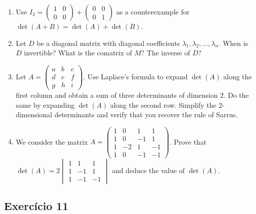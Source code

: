 \begin{enumerate}
\item Use $I_2 = \begin{pmatrix} 1 & 0 \\ 0 & 0 \end{pmatrix}
  + \begin{pmatrix} 0 & 0 \\ 0 & 1 \end{pmatrix}$ as a counterexample
  for $\det{(A+B)} = \det{(A)} + \det{(B)}$.
\item Let $D$ be a diagonal matrix with diagonal coefficients
  $\lambda_1, \lambda_2, \dots, \lambda_n$. When is $D$ invertible?
  What is the comatrix of $M$? The inverse of $D$?
\item Let $A = \begin{pmatrix}
  a & b & c \\
  d & e & f \\
  g & h & i \end{pmatrix}$.
  Use Laplace's formula to expand
  $\det{(A)}$ along the first column and obtain
  a sum of three determinants of dimension $2$.
  Do the same by expanding $\det{(A)}$ along the second row.
  Simplify the $2$-dimensional determinants and verify that you recover
  the rule of Sarrus.
\item We consider the matrix
  $A = \begin{pmatrix}
  1 & 0 & 1 & 1 \\
  1 & 0 & -1 & 1 \\
  1 & -2 & 1 & -1 \\
  1 & 0 & -1 & -1 \end{pmatrix}$. Prove that
  $\det{(A)} = 2 \begin{vmatrix}
  1 & 1 & 1 \\
  1 & -1 & 1 \\
  1 & -1 & -1 \end{vmatrix}$ and deduce the value of $\det{(A)}$.
\end{enumerate}

\subsection*{Exercício 11}

